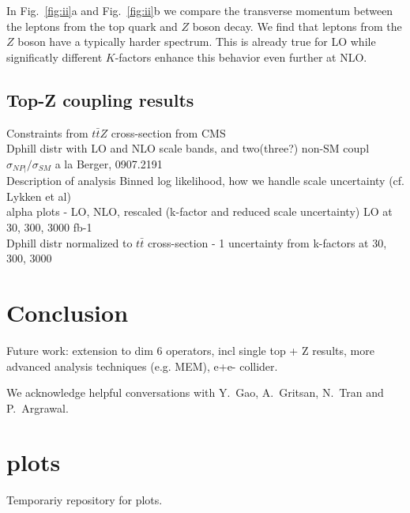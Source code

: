 \documentclass[preprint]{JHEP3} %
\begin{document}
In Fig.~\ref{fig:ii}a and Fig.~\ref{fig:ii}b we compare the transverse momentum between the leptons from the top quark and $Z$ boson decay.
We find that leptons from the $Z$ boson have a typically harder spectrum. 
This is already true for LO while significatly different $K$-factors enhance this behavior even further at NLO.


\subsection{Top-Z coupling results}
Constraints from $t\bar{t}Z$ cross-section from CMS \\
Dphill distr with LO and NLO scale bands, and two(three?) non-SM coupl\\
$\sigma_{NP|} / \sigma_{SM}$ a la Berger, 0907.2191 \\
Description of analysis Binned log likelihood, how we handle scale uncertainty (cf. Lykken et al) \\
alpha plots - LO, NLO, rescaled (k-factor and reduced scale uncertainty) LO at 30, 300, 3000 fb-1\\
Dphill distr normalized to $t\bar{t}$ cross-section  - 1 uncertainty from k-factors at 30, 300, 3000\\

\section{Conclusion}
Future work: extension to dim 6 operators, incl single top + Z results, more advanced analysis techniques (e.g. MEM), e+e- collider.
%


\acknowledgments
We acknowledge helpful conversations with Y.~Gao, A.~Gritsan, N.~Tran and P.~Argrawal. 



\appendix
\section{plots}
Temporariy repository for plots.
\end{document}
